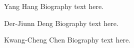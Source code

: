 \documentclass[journal]{IEEEtran}
\begin{document}
\begin{IEEEbiography}{Yang Hang}
Biography text here.
\end{IEEEbiography}

\begin{IEEEbiographynophoto}{Der-Jiunn Deng}
Biography text here.
\end{IEEEbiographynophoto}


\begin{IEEEbiographynophoto}{Kwang-Cheng Chen}
Biography text here.
\end{IEEEbiographynophoto}






\end{document}
